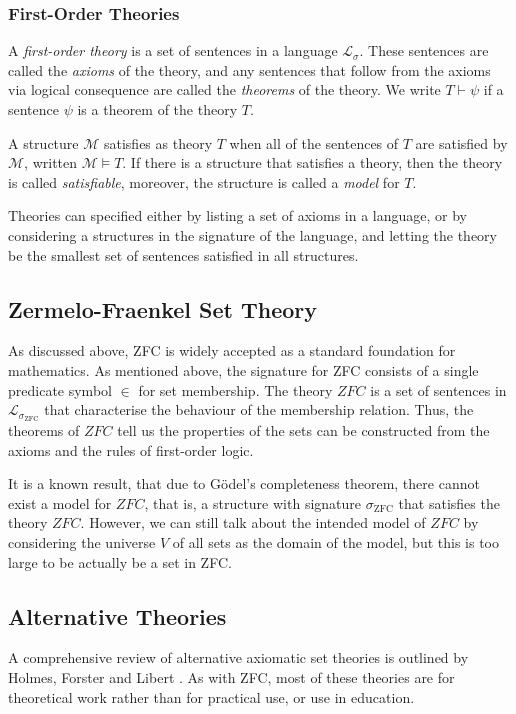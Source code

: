 \documentclass[12pt]{article}
\theoremstyle{definition}
\begin{document}
\subsubsection{First-Order Theories}
A \emph{first-order theory} is a set of sentences in a language $\mathcal{L}_\sigma$.
These sentences are called the \emph{axioms} of the theory, and any sentences that follow from the axioms via logical consequence are called the \emph{theorems} of the theory. We write $T\vdash \psi$ if a sentence $\psi$ is a theorem of the theory $T$.

A structure $\mathcal M$ satisfies as theory $T$ when all of the sentences of $T$ are satisfied by $\mathcal{M}$, written $\mathcal{M} \vDash T$. If there is a structure that satisfies a theory, then the theory is called \emph{satisfiable}, moreover, the structure is called a \emph{model} for $T$.

Theories can specified either by listing a set of axioms in a language, or by considering a structures in the signature of the language, and letting the theory be the smallest set of sentences satisfied in all structures.

\subsection{Zermelo-Fraenkel Set Theory}
As discussed above, ZFC is widely accepted as a standard foundation for mathematics.
As mentioned above, the signature for ZFC consists of a single predicate symbol $\in$ for set membership.
The theory $ZFC$ is a set of sentences in $\mathcal{L}_{\sigma_{\text{ZFC}}}$ that characterise the behaviour of the membership relation.
Thus, the theorems of $ZFC$ tell us the properties of the sets can be constructed from the axioms and the rules of first-order logic.

It is a known result, that due to G\"odel's completeness theorem, there cannot exist a model for $ZFC$, that is, a structure with signature $\sigma_{\text{ZFC}}$ that satisfies the theory $ZFC$.
However, we can still talk about the intended model of $ZFC$ by considering the universe $V$ of all sets as the domain of the model, but this is too large to be actually be a set in ZFC.
\subsection{Alternative Theories}
A comprehensive review of alternative axiomatic set theories is outlined by Holmes, Forster and Libert \cite{ast}.
As with ZFC, most of these theories are for theoretical work rather than for practical use, or use in education.
\end{document}
